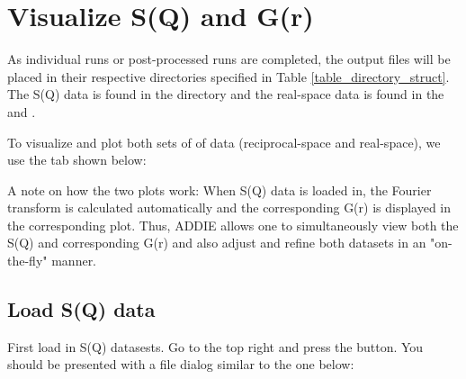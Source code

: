\section{Visualize S(Q) and G(r)}

As individual runs or post-processed runs are completed, the output files will be placed in their respective directories specified in Table \ref{table_directory_struct}. The S(Q) data is found in the  directory and the real-space data is found in the  and . 

To visualize and plot both sets of of data (reciprocal-space and real-space), we use the  tab shown below: 

\noindent{}

A note on how the two plots work: When S(Q) data is loaded in, the Fourier transform is calculated automatically and the corresponding G(r) is displayed in the corresponding plot. Thus, ADDIE allows one to simultaneously view both the S(Q) and corresponding G(r) and also adjust and refine both datasets in an "on-the-fly" manner.

\subsection{Load S(Q) data}

First load in S(Q) datasests. Go to the top right and press the  button. You should be presented with a file dialog similar to the one below:

\noindent{}

